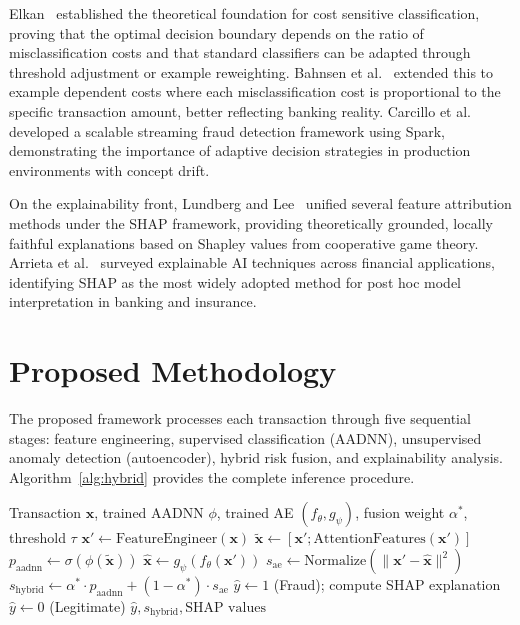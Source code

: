 \documentclass[conference]{IEEEtran}
\begin{document}
Elkan~\cite{elkan2001foundations} established the theoretical foundation for cost sensitive classification, proving that the optimal decision boundary depends on the ratio of misclassification costs and that standard classifiers can be adapted through threshold adjustment or example reweighting. Bahnsen et al.~\cite{bahnsen2016example} extended this to example dependent costs where each misclassification cost is proportional to the specific transaction amount, better reflecting banking reality. Carcillo et al.~\cite{carcillo2018streaming} developed a scalable streaming fraud detection framework using Spark, demonstrating the importance of adaptive decision strategies in production environments with concept drift.

On the explainability front, Lundberg and Lee~\cite{lundberg2017unified} unified several feature attribution methods under the SHAP framework, providing theoretically grounded, locally faithful explanations based on Shapley values from cooperative game theory. Arrieta et al.~\cite{arrieta2020explainable} surveyed explainable AI techniques across financial applications, identifying SHAP as the most widely adopted method for post hoc model interpretation in banking and insurance.

\section{Proposed Methodology}
\label{sec:method}

The proposed framework processes each transaction through five sequential stages: feature engineering, supervised classification (AADNN), unsupervised anomaly detection (autoencoder), hybrid risk fusion, and explainability analysis. Algorithm~\ref{alg:hybrid} provides the complete inference procedure.

\begin{algorithm}[!t]
\caption{Hybrid Fraud Detection Inference}
\label{alg:hybrid}
\begin{algorithmic}[1]
\REQUIRE Transaction $\mathbf{x}$, trained AADNN $\phi$, trained AE $(f_\theta, g_\psi)$, fusion weight $\alpha^*$, threshold $\tau$
\STATE $\mathbf{x}' \leftarrow \text{FeatureEngineer}(\mathbf{x})$ 
\STATE $\tilde{\mathbf{x}} \leftarrow [\mathbf{x}'; \text{AttentionFeatures}(\mathbf{x}')]$ 
\STATE $p_{\text{aadnn}} \leftarrow \sigma(\phi(\tilde{\mathbf{x}}))$ 
\STATE $\hat{\mathbf{x}} \leftarrow g_\psi(f_\theta(\mathbf{x}'))$ 
\STATE $s_{\text{ae}} \leftarrow \text{Normalize}(\|\mathbf{x}' - \hat{\mathbf{x}}\|^2)$ 
\STATE $s_{\text{hybrid}} \leftarrow \alpha^* \cdot p_{\text{aadnn}} + (1-\alpha^*) \cdot s_{\text{ae}}$
    \STATE $\hat{y} \leftarrow 1$ (Fraud); compute SHAP explanation
\ELSE
    \STATE $\hat{y} \leftarrow 0$ (Legitimate)
\ENDIF
\RETURN $\hat{y}, s_{\text{hybrid}}, \text{SHAP values}$
\end{algorithmic}
\end{algorithm}
\end{document}
